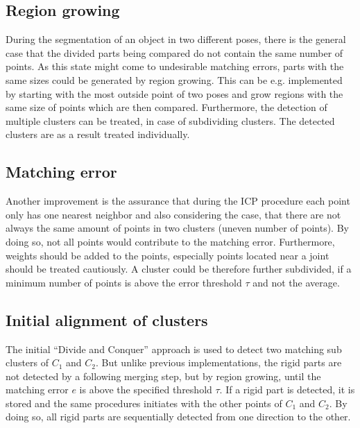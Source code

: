 \subsection{Region growing}
During the segmentation of an object in two different poses, there is the general case that the divided parts being compared do not contain the same number of points. As this state might come to undesirable matching errors, parts with the same sizes could be generated by region growing. This can be e.g. implemented by starting with the most outside point of two poses and grow regions with the same size of points which are then compared. Furthermore, the detection of multiple clusters can be treated, in case of subdividing clusters. The detected clusters are as a result treated individually.

\subsection{Matching error}
Another improvement is the assurance that during the ICP procedure each point only has one nearest neighbor and also considering the case, that there are not always the same amount of points in two clusters (uneven number of points). By doing so, not all points would contribute to the matching error. Furthermore, weights should be added to the points, especially points located near a joint should be treated cautiously. A cluster could be therefore further subdivided, if a minimum number of points is above the error threshold $\tau$ and not the average. 

\subsection{Initial alignment of clusters}
The initial ``Divide and Conquer'' approach is used to detect two matching sub clusters of $C_1$ and $C_2$. But unlike previous implementations, the rigid parts are not detected by a following merging step, but by region growing, until the matching error $e$ is above the specified threshold $\tau$.
If a rigid part is detected, it is stored and the same procedures initiates with the other points of $C_1$ and $C_2$. By doing so, all rigid parts are sequentially detected from one direction to the other.


